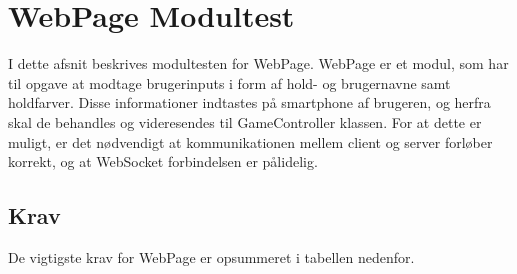 \documentclass[Modultest/Modultest_main.tex]{subfiles}
\begin{document}
\lstset{style=customc}

\section{WebPage Modultest}
I dette afsnit beskrives modultesten for WebPage. WebPage er et modul, som har til opgave at modtage brugerinputs i form af hold- og brugernavne samt holdfarver. Disse informationer indtastes på smartphone af brugeren, og herfra skal de behandles og videresendes til GameController klassen. For at dette er muligt, er det nødvendigt at kommunikationen mellem client og server forløber korrekt, og at WebSocket forbindelsen er pålidelig.

\subsection{Krav}
De vigtigste krav for WebPage er opsummeret i tabellen nedenfor.
\end{document}
